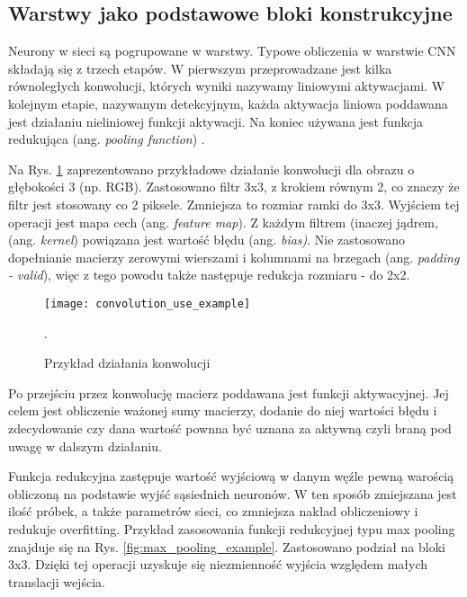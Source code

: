 \subsection{Warstwy jako podstawowe bloki konstrukcyjne}

Neurony w sieci są pogrupowane w warstwy. Typowe obliczenia w warstwie CNN składają się z trzech etapów. W pierwszym przeprowadzane jest kilka równoległych konwolucji, których wyniki nazywamy liniowymi aktywacjami. W kolejnym etapie, nazywanym detekcyjnym, każda aktywacja liniowa poddawana jest działaniu nieliniowej funkcji aktywacji. Na koniec używana jest funkcja redukująca (ang. \textit{pooling function}) \cite{deep_learning}.

{\parindent0pt %
Na Rys. \ref{fig:convolution_example} zaprezentowano przykładowe działanie konwolucji dla obrazu o głębokości 3 (np. RGB). Zastosowano filtr 3x3, z krokiem równym 2, co znaczy że filtr jest stosowany co 2 piksele. Zmniejsza to rozmiar ramki do 3x3. Wyjściem tej operacji jest mapa cech (ang. \textit{feature map}). Z każdym filtrem (inaczej jądrem, (ang. \textit{kernel}) powiązana jest wartość błędu (ang. \textit{bias)}. Nie zastosowano dopełnianie macierzy zerowymi wierszami i kolumnami na brzegach (ang. \textit{padding - valid}), więc z tego powodu także następuje redukcja rozmiaru - do 2x2. 

\begin{figure}[h]
	\centering
	\centering
		\texttt{[image: convolution\_use\_example]}	
	\caption{Przykład działania konwolucji}.
	\label{fig:convolution_example}
\end{figure}

Po przejściu przez konwolucję macierz poddawana jest funkcji aktywacyjnej. Jej celem jest obliczenie ważonej sumy macierzy, dodanie do niej wartości błędu i zdecydowanie czy dana wartość pownna być uznana za aktywną czyli braną pod uwagę w dalszym działaniu.

Funkcja redukcyjna zastępuje wartość wyjściową w danym węźle pewną warością obliczoną na podstawie wyjść sąsiednich neuronów. W ten sposób zmiejszana jest ilość próbek, a także parametrów sieci, co zmniejsza nakład obliczeniowy i redukuje overfitting. Przykład zasosowania funkcji redukcyjnej typu max pooling znajduje się na Rys. \ref{fig:max_pooling_example}. Zastosowano podział na bloki 3x3. Dzięki tej operacji uzyskuje się niezmienność wyjścia względem małych translacji wejścia.

}
